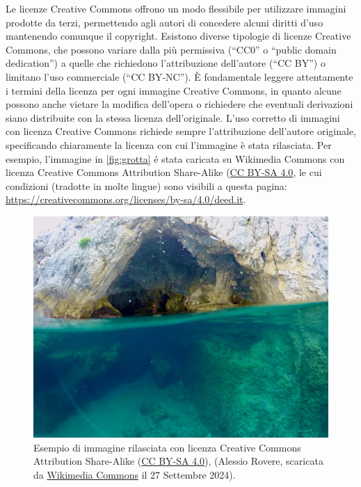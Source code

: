 \documentclass[9pt,a4paper,twoside]{rho-class/rho}
\begin{document}
Le licenze Creative Commons offrono un modo flessibile per utilizzare immagini prodotte da terzi, permettendo agli autori di concedere alcuni diritti d’uso mantenendo comunque il copyright. Esistono diverse tipologie di licenze Creative Commons, che possono variare dalla più permissiva (“CC0” o “public domain dedication”) a quelle che richiedono l’attribuzione dell’autore (“CC BY”) o limitano l’uso commerciale (“CC BY-NC”). È fondamentale leggere attentamente i termini della licenza per ogni immagine Creative Commons, in quanto alcune possono anche vietare la modifica dell’opera o richiedere che eventuali derivazioni siano distribuite con la stessa licenza dell’originale. L’uso corretto di immagini con licenza Creative Commons richiede sempre l’attribuzione dell’autore originale, specificando chiaramente la licenza con cui l’immagine è stata rilasciata. Per esempio, l'immagine in \autoref{fig:grotta} é stata caricata su Wikimedia Commons con licenza Creative Commons Attribution Share-Alike (\href{https://creativecommons.org/licenses/by-sa/4.0}{CC BY-SA 4.0}, le cui condizioni (tradotte in molte lingue) sono visibili a questa pagina: \url{https://creativecommons.org/licenses/by-sa/4.0/deed.it}. 

\begin{figure}[h!]
    \centering
    \includegraphics[width=0.8\linewidth]{figures/1024px-Marine_cave_Bergeggi.jpg}
    \caption{Esempio di immagine rilasciata con licenza Creative Commons Attribution Share-Alike (\href{https://creativecommons.org/licenses/by-sa/4.0}{CC BY-SA 4.0}), (Alessio Rovere, scaricata da \href{(https://commons.wikimedia.org/wiki/File:Marine_cave_Bergeggi.jpg}{Wikimedia Commons} il 27 Settembre 2024).}
    \label{fig:grotta}
\end{figure}
\end{document}
